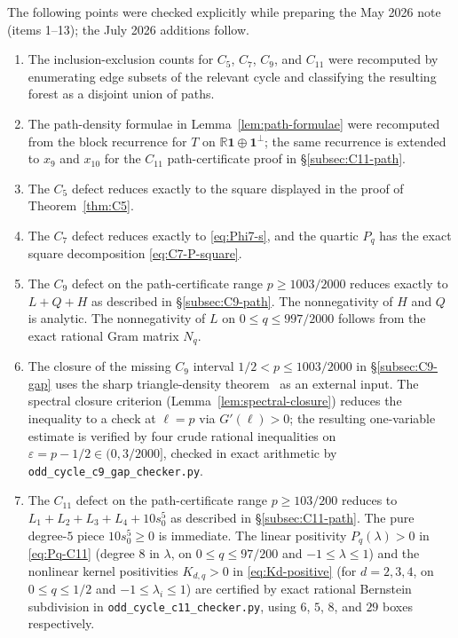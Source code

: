 \documentclass[11pt]{article}
\newcommand{\one}{\mathbf 1}
\newcommand{\eps}{\varepsilon}
\begin{document}
The following points were checked explicitly while preparing the May 2026 note (items 1--13); the July 2026 additions follow.
\begin{enumerate}[label=\textup{(\arabic*)}]
    \item The inclusion-exclusion counts for $C_5$, $C_7$, $C_9$, and $C_{11}$ were recomputed by enumerating edge subsets of the relevant cycle and classifying the resulting forest as a disjoint union of paths.
    \item The path-density formulae in Lemma~\ref{lem:path-formulae} were recomputed from the block recurrence for $T$ on $\mathbb R\one\oplus\one^\perp$; the same recurrence is extended to $x_9$ and $x_{10}$ for the $C_{11}$ path-certificate proof in \S\ref{subsec:C11-path}.
    \item The $C_5$ defect reduces exactly to the square displayed in the proof of Theorem~\ref{thm:C5}.
    \item The $C_7$ defect reduces exactly to \eqref{eq:Phi7-s}, and the quartic $P_q$ has the exact square decomposition \eqref{eq:C7-P-square}.
    \item The $C_9$ defect on the path-certificate range $p\ge1003/2000$ reduces exactly to $L+Q+H$ as described in \S\ref{subsec:C9-path}.  The nonnegativity of $H$ and $Q$ is analytic.  The nonnegativity of $L$ on $0\le q\le997/2000$ follows from the exact rational Gram matrix $N_q$.
    \item The closure of the missing $C_9$ interval $1/2<p\le1003/2000$ in \S\ref{subsec:C9-gap} uses the sharp triangle-density theorem~\cite{RazborovTriangles,ReiherCliqueDensity} as an external input.  The spectral closure criterion (Lemma~\ref{lem:spectral-closure}) reduces the inequality to a check at $\ell=p$ via $G'(\ell)>0$; the resulting one-variable estimate is verified by four crude rational inequalities on $\eps=p-1/2\in(0,3/2000]$, checked in exact arithmetic by \texttt{odd\_cycle\_c9\_gap\_checker.py}.
    \item The $C_{11}$ defect on the path-certificate range $p\ge103/200$ reduces to $L_1+L_2+L_3+L_4+10s_0^5$ as described in \S\ref{subsec:C11-path}.  The pure degree-$5$ piece $10s_0^5\ge0$ is immediate.  The linear positivity $P_q(\lambda)>0$ in \eqref{eq:Pq-C11} (degree $8$ in $\lambda$, on $0\le q\le 97/200$ and $-1\le\lambda\le1$) and the nonlinear kernel positivities $K_{d,q}>0$ in \eqref{eq:Kd-positive} (for $d=2,3,4$, on $0\le q\le1/2$ and $-1\le\lambda_i\le1$) are certified by exact rational Bernstein subdivision in \texttt{odd\_cycle\_c11\_checker.py}, using $6$, $5$, $8$, and $29$ boxes respectively.

\end{enumerate}
\end{document}
